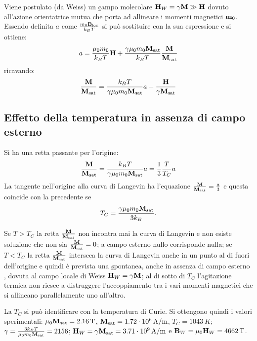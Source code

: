 Viene postulato (da Weiss) un \b{campo molecolare} $\H_W=\gamma\M\gg \H$ dovuto all'azione orientatrice mutua che porta ad allineare i momenti magnetici $\m_0$. Essendo definita $a$ come $\frac{m_0\Bl}{k_BT}$ si può sostituire \dBl con la sua espressione e si ottiene:
\begin{equation}\begin{split}
a=\frac{\mu_0m_0}{k_BT}\H+\frac{\gamma\mu_0m_0\M_{\sat}}{k_BT}\frac{\M}{\M_{\sat}}
\end{split}\end{equation}
ricavando:
\begin{equation}\begin{split}
\frac{\M}{\M_\sat}=\frac{k_BT}{\gamma\mu_0m_0\M_\sat}a-\frac{\H}{\gamma\M_\sat}
\end{split}\end{equation}

\subsection{Effetto della temperatura in assenza di campo esterno}
Si ha una retta passante per l'origine:
\begin{equation}\begin{split}
\frac{\M}{\M_\sat}=\frac{k_BT}{\gamma\mu_0m_0\M_\sat}a=\frac{1}{3}\frac{T}{T_C}a
\end{split}\end{equation}
La tangente nell'origine alla curva di Langevin ha l'equazione $\frac{\M}{\M_\sat}=\frac{a}{3}$ e questa coincide con la precedente se
\begin{equation}\begin{split}
T_C=\frac{\gamma\mu_0m_0\M_\sat}{3k_B}.
\end{split}\end{equation}

Se $T>T_C$ la retta $\frac{\M}{\M_\sat}$ non incontra mai la curva di Langevin e non esiste soluzione che non sia $\frac{\M}{\M_\sat}=0$; a campo esterno nullo corrisponde \magn nulla; se $T<T_C$ la retta $\frac{\M}{\M_\sat}$ interseca la curva di Langevin anche in un punto al di fuori dell'origine e quindi è prevista una \b{\magn spontanea}, anche in assenza di campo esterno \dH, dovuta al campo locale di Weiss $\H_W=\gamma\M$; al di sotto di $T_C$ l'agitazione termica non riesce a distruggere l'accoppiamento tra i vari momenti magnetici che si allineano parallelamente uno all'altro.

La $T_C$ si può identificare con la temperatura di Curie. Si ottengono quindi i valori sperimentali: $\mu_0\M_\sat=\SI{2.16}{T}$, $\M_\sat=\SI[exponent-product = \cdot]{1.72e6}{A/m}$, $T_C=\SI[exponent-product = \cdot]{1043}{K}$; $\gamma=\frac{3k_BT}{\mu_0m_0\M_\sat}=2156$; $\H_W=\gamma\M_\sat=\SI[exponent-product = \cdot]{3.71e9}{A/m}$ e $\B_W=\mu_0\H_W=\SI[exponent-product = \cdot]{4662}{T}$.

